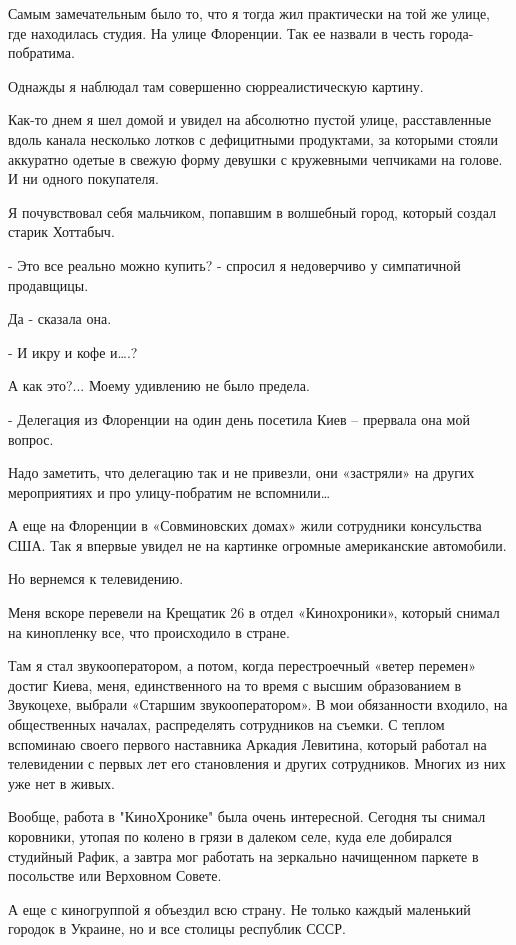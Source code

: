 Самым замечательным было то, что я тогда жил практически на той же улице, где
находилась студия. На улице Флоренции. Так ее назвали в честь города-
побратима. 

	Однажды я наблюдал там совершенно сюрреалистическую картину.

Как-то днем я шел домой и увидел на абсолютно пустой улице, расставленные вдоль
канала несколько лотков с дефицитными продуктами, за которыми стояли аккуратно
одетые в свежую форму девушки с кружевными чепчиками на голове. И ни одного
покупателя.

Я почувствовал себя мальчиком, попавшим в волшебный город, который создал
старик Хоттабыч.

- Это все реально можно купить? - спросил я недоверчиво у симпатичной
продавщицы.

 Да - сказала она.

- И икру и кофе и….?

А как это?... Моему удивлению не было предела.

- Делегация из Флоренции на один день посетила Киев – прервала она мой вопрос.

Надо заметить, что делегацию так и не привезли, они «застряли» на других
мероприятиях и про улицу-побратим не вспомнили…

А еще на Флоренции в «Совминовских домах» жили сотрудники консульства США. Так
я впервые увидел не на картинке огромные американские автомобили.

Но вернемся к телевидению.

Меня вскоре перевели на Крещатик 26 в отдел «Кинохроники», который снимал на
кинопленку все, что происходило в стране.

Там я стал звукооператором, а потом, когда перестроечный «ветер перемен» достиг
Киева, меня, единственного на то время с высшим образованием в Звукоцехе,
выбрали «Старшим звукооператором». В мои обязанности входило, на общественных
началах, распределять сотрудников на съемки. С теплом вспоминаю своего первого
наставника Аркадия Левитина, который работал на телевидении  с первых лет его
становления и других сотрудников. Многих из них уже нет в живых.

Вообще, работа в "КиноХронике" была очень интересной. Сегодня ты снимал
коровники, утопая по колено в грязи в далеком селе, куда еле добирался
студийный Рафик, а завтра мог работать на зеркально начищенном паркете в
посольстве или Верховном Совете.

А еще с киногруппой я объездил всю страну. Не только каждый маленький городок в
Украине, но и все столицы республик СССР.


